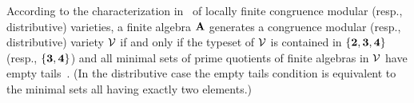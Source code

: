 \documentclass{ws-ijac}
\begin{document}

According to the characterization
in~\cite[Chapter~8]{HM:1988} of locally finite congruence modular (resp.,
distributive) varieties, a finite algebra $\mathbf{A}$ generates a congruence modular
(resp., distributive) variety $\mathcal{V}$ if and only if the typeset
of $\mathcal{V}$ is
contained in $\{\textbf{2}, \textbf{3}, \textbf{4}\}$ (resp., $\{\textbf{3}, \textbf{4}\}$)
and all minimal sets of prime
quotients of finite algebras in $\mathcal{V}$ have empty
tails~\cite[Def.~2.15]{HM:1988}. (In the distributive
case the empty tails condition is equivalent to the minimal sets all having exactly
two elements.)
\end{document}
